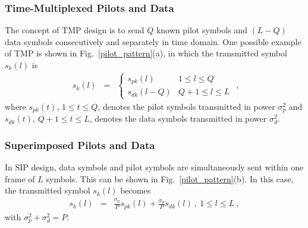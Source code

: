\documentclass[10pt,fleqn, twocolumn]{IEEEtran}
\begin{document}
\subsubsection{Time-Multiplexed Pilots and Data}
The concept of TMP design is to send $Q$ known pilot symbols and
$\left(L-Q\right)$ data symbols consecutively and separately in
time domain. One possible example of TMP is shown in
Fig.~\ref{pilot_pattern}(a), in which the transmitted symbol
$s_{k}(l)$ is
\begin{equation}
\begin{array}{rcl}
s_{k}\left(l\right)&=&
\begin{cases}
s_{pk}(l) & 1 \leq l \leq Q \\
s_{dk}(l-Q) & Q+1\leq l\leq L
\end{cases}
\end{array},\label{TMP_k}
\end{equation}
\noindent where $s_{pk}(t)$, $1\leq t \leq Q$, denotes the pilot
symbols transmitted in power $\sigma_{p}^2$ and $s_{dk}(t)$,
$Q+1\leq t \leq L$, denotes the data symbols transmitted in power
$\sigma_{d}^2$.
\subsubsection{Superimposed Pilots and Data}
In SIP design, data symbols and pilot symbols are simultaneously
sent within one frame of $L$ symbols. This can be shown in
Fig.~\ref{pilot_pattern}(b). In this case, the transmitted symbol
$s_{k}(l)$ becomes
\begin{equation}
\begin{array}{rcl}
s_{k}\left(l\right)&=&\frac{\sigma_{p}}{P}s_{pk}\left(l\right)+\frac{\sigma_{d}}{P}s_{dk}\left(l\right)\
,\ 1\leq l\leq L\ ,
\end{array}\label{SIP_k}
\end{equation}
\noindent with $\sigma_{p}^2+\sigma_{d}^2=P$.
\end{document}
